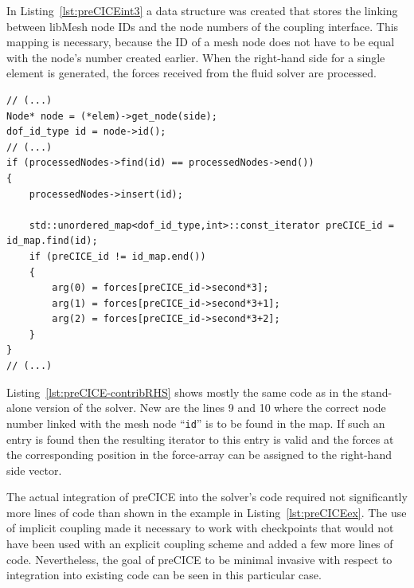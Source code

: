    In Listing~\ref{lst:preCICEint3} a data structure was created that stores the linking between libMesh node IDs and the node numbers of the coupling interface. This mapping is necessary, because the ID of a mesh node does not have to be equal with the node's number created earlier. When the right-hand side for a single element is generated, the forces received from the fluid solver are processed.
\begin{lstlisting}[caption=Modification of contribRHS-function,label=lst:preCICE-contribRHS,keepspaces=true]
// (...)
Node* node = (*elem)->get_node(side);
dof_id_type id = node->id();
// (...)
if (processedNodes->find(id) == processedNodes->end())
{
	processedNodes->insert(id);

	std::unordered_map<dof_id_type,int>::const_iterator preCICE_id = id_map.find(id);
	if (preCICE_id != id_map.end())
	{
		arg(0) = forces[preCICE_id->second*3];
		arg(1) = forces[preCICE_id->second*3+1];
		arg(2) = forces[preCICE_id->second*3+2];
	}
}
// (...)
\end{lstlisting}   
   Listing~\ref{lst:preCICE-contribRHS} shows mostly the same code as in the stand-alone version of the solver. New are the lines 9 and 10 where the correct node number linked with the mesh node ``\texttt{id}'' is to be found in the map. If such an entry is found then the resulting iterator to this entry is valid and the forces at the corresponding position in the force-array can be assigned to the right-hand side vector.

   The actual integration of preCICE into the solver's code required not significantly more lines of code than shown in the example in Listing~\ref{lst:preCICEex}. The use of implicit coupling made it necessary to work with checkpoints that would not have been used with an explicit coupling scheme and added a few more lines of code. Nevertheless, the goal of preCICE to be minimal invasive with respect to integration into existing code can be seen in this particular case.